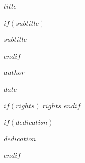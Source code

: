 \documentclass[
  11pt,
  openany
]{book}
\newcommand{\BookVFill}{\vspace*{\fill}}
\begin{document}

\frontmatter


\thispagestyle{empty}

\begin{center}

\BookVFill

{\fontsize{30}{36}\selectfont\bfseries $title$\par}

$if(subtitle)$
\vspace{0.8cm}
{\Large\itshape $subtitle$\par}
$endif$

\BookVFill

{\Large $author$\par}

\vspace{1cm}

{\small $date$\par}

\BookVFill

\end{center}

\clearpage


\thispagestyle{empty}

\vspace*{\fill}

{\small
$if(rights)$
$rights$
$endif$
}

\clearpage


$if(dedication)$

\thispagestyle{empty}

\begin{flushright}
\vspace*{0.35\textheight}
\itshape
$dedication$
\end{flushright}

\clearpage

$endif$
\end{document}
